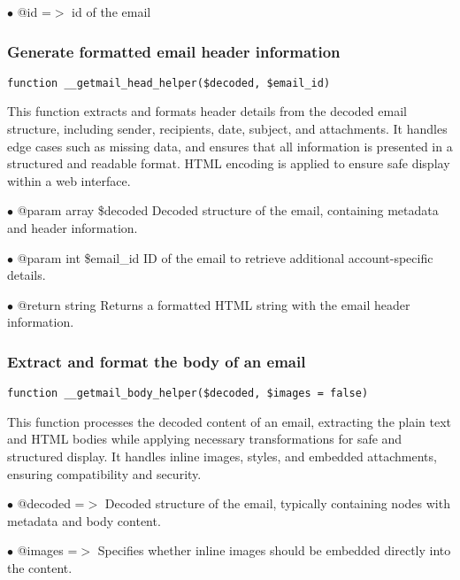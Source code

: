 \documentclass[a4paper]{article}
\begin{document}
\begin{compactitem}
\item[\color{myblue}$\bullet$] @id =$>$ id of the email
\end{compactitem}

\hypertarget{toc94}{}
\subsubsection{Generate formatted email header information}

\begin{lstlisting}
function __getmail_head_helper($decoded, $email_id)
\end{lstlisting}

This function extracts and formats header details from the decoded email structure,
including sender, recipients, date, subject, and attachments. It handles edge cases
such as missing data, and ensures that all information is presented in a structured
and readable format. HTML encoding is applied to ensure safe display within a web interface.

\begin{compactitem}
\item[\color{myblue}$\bullet$] @param array \$decoded Decoded structure of the email, containing metadata and header information.
\item[\color{myblue}$\bullet$] @param int \$email\_id ID of the email to retrieve additional account-specific details.
\item[\color{myblue}$\bullet$] @return string Returns a formatted HTML string with the email header information.
\end{compactitem}

\hypertarget{toc95}{}
\subsubsection{Extract and format the body of an email}

\begin{lstlisting}
function __getmail_body_helper($decoded, $images = false)
\end{lstlisting}

This function processes the decoded content of an email, extracting the plain
text and HTML bodies while applying necessary transformations for safe and
structured display. It handles inline images, styles, and embedded attachments,
ensuring compatibility and security.

\begin{compactitem}
\item[\color{myblue}$\bullet$] @decoded =$>$ Decoded structure of the email, typically containing nodes with
            metadata and body content.
\item[\color{myblue}$\bullet$] @images  =$>$ Specifies whether inline images should be embedded directly into
            the content.
\end{compactitem}
\end{document}
